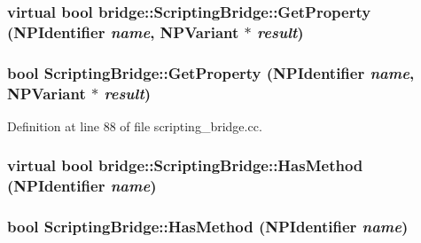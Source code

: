 \hypertarget{classbridge_1_1_scripting_bridge_aa7f5844674672f5872137ffee032427e}{
\subsubsection[{GetProperty}]{\setlength{\rightskip}{0pt plus 5cm}virtual bool bridge::ScriptingBridge::GetProperty (NPIdentifier {\em name}, \/  NPVariant $\ast$ {\em result})}}
\label{classbridge_1_1_scripting_bridge_aa7f5844674672f5872137ffee032427e}
\hypertarget{classbridge_1_1_scripting_bridge_afef889fc2ff5ccabefb713cf7ad5e056}{
\subsubsection[{GetProperty}]{\setlength{\rightskip}{0pt plus 5cm}bool ScriptingBridge::GetProperty (NPIdentifier {\em name}, \/  NPVariant $\ast$ {\em result})}}
\label{classbridge_1_1_scripting_bridge_afef889fc2ff5ccabefb713cf7ad5e056}


Definition at line 88 of file scripting\_\-bridge.cc.

\hypertarget{classbridge_1_1_scripting_bridge_af968e6487c5cc9e2566118634c0ab561}{
\subsubsection[{HasMethod}]{\setlength{\rightskip}{0pt plus 5cm}virtual bool bridge::ScriptingBridge::HasMethod (NPIdentifier {\em name})}}
\label{classbridge_1_1_scripting_bridge_af968e6487c5cc9e2566118634c0ab561}
\hypertarget{classbridge_1_1_scripting_bridge_a1d614bb3696baef7c46332426ab7a0dc}{
\subsubsection[{HasMethod}]{\setlength{\rightskip}{0pt plus 5cm}bool ScriptingBridge::HasMethod (NPIdentifier {\em name})}}
\label{classbridge_1_1_scripting_bridge_a1d614bb3696baef7c46332426ab7a0dc}


